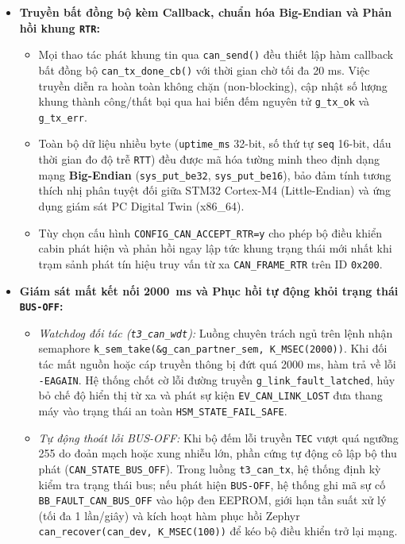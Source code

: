 \begin{itemize}[nosep]
\begin{itemize}[nosep]
    \end{itemize}
    \item \textbf{Truyền bất đồng bộ kèm Callback, chuẩn hóa Big-Endian và Phản hồi khung \texttt{RTR}:}
    \begin{itemize}[nosep]
        \item Mọi thao tác phát khung tin qua \texttt{can\_send()} đều thiết lập hàm callback bất đồng bộ \texttt{can\_tx\_done\_cb()} với thời gian chờ tối đa 20 ms. Việc truyền diễn ra hoàn toàn không chặn (non-blocking), cập nhật số lượng khung thành công/thất bại qua hai biến đếm nguyên tử \texttt{g\_tx\_ok} và \texttt{g\_tx\_err}.
        \item Toàn bộ dữ liệu nhiều byte (\texttt{uptime\_ms} 32-bit, số thứ tự \texttt{seq} 16-bit, dấu thời gian đo độ trễ \texttt{RTT}) đều được mã hóa tường minh theo định dạng mạng \textbf{Big-Endian} (\texttt{sys\_put\_be32}, \texttt{sys\_put\_be16}), bảo đảm tính tương thích nhị phân tuyệt đối giữa STM32 Cortex-M4 (Little-Endian) và ứng dụng giám sát PC Digital Twin (x86\_64).
        \item Tùy chọn cấu hình \texttt{CONFIG\_CAN\_ACCEPT\_RTR=y} cho phép bộ điều khiển cabin phát hiện và phản hồi ngay lập tức khung trạng thái mới nhất khi trạm sảnh phát tín hiệu truy vấn từ xa \texttt{CAN\_FRAME\_RTR} trên ID \texttt{0x200}.
    \end{itemize}
    \item \textbf{Giám sát mất kết nối 2000~ms và Phục hồi tự động khỏi trạng thái \texttt{BUS-OFF}:}
    \begin{itemize}[nosep]
        \item \textit{Watchdog đối tác (\texttt{t3\_can\_wdt}):} Luồng chuyên trách ngủ trên lệnh nhận semaphore \texttt{k\_sem\_take(\&g\_can\_partner\_sem, K\_MSEC(2000))}. Khi đối tác mất nguồn hoặc cáp truyền thông bị đứt quá 2000 ms, hàm trả về lỗi \texttt{-EAGAIN}. Hệ thống chốt cờ lỗi đường truyền \texttt{g\_link\_fault\_latched}, hủy bỏ chế độ hiển thị từ xa và phát sự kiện \texttt{EV\_CAN\_LINK\_LOST} đưa thang máy vào trạng thái an toàn \texttt{HSM\_STATE\_FAIL\_SAFE}.
        \item \textit{Tự động thoát lỗi BUS-OFF:} Khi bộ đếm lỗi truyền \texttt{TEC} vượt quá ngưỡng 255 do đoản mạch hoặc xung nhiễu lớn, phần cứng tự động cô lập bộ thu phát (\texttt{CAN\_STATE\_BUS\_OFF}). Trong luồng \texttt{t3\_can\_tx}, hệ thống định kỳ kiểm tra trạng thái bus; nếu phát hiện \texttt{BUS-OFF}, hệ thống ghi mã sự cố \texttt{BB\_FAULT\_CAN\_BUS\_OFF} vào hộp đen EEPROM, giới hạn tần suất xử lý (tối đa 1 lần/giây) và kích hoạt hàm phục hồi Zephyr \texttt{can\_recover(can\_dev, K\_MSEC(100))} để kéo bộ điều khiển trở lại mạng.
    \end{itemize}
\end{itemize}

